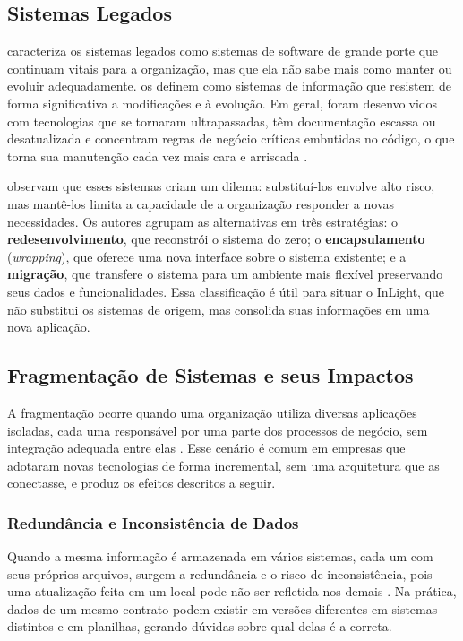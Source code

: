 \subsection{Sistemas Legados}

\citet{bennett1995} caracteriza os sistemas legados como sistemas de software de grande porte que continuam vitais para a organização, mas que ela não sabe mais como manter ou evoluir adequadamente. \citet{bisbal1999} os definem como sistemas de informação que resistem de forma significativa a modificações e à evolução. Em geral, foram desenvolvidos com tecnologias que se tornaram ultrapassadas, têm documentação escassa ou desatualizada e concentram regras de negócio críticas embutidas no código, o que torna sua manutenção cada vez mais cara e arriscada \citep{bisbal1999,pressman2016}.

\citet{bisbal1999} observam que esses sistemas criam um dilema: substituí-los envolve alto risco, mas mantê-los limita a capacidade de a organização responder a novas necessidades. Os autores agrupam as alternativas em três estratégias: o \textbf{redesenvolvimento}, que reconstrói o sistema do zero; o \textbf{encapsulamento} (\textit{wrapping}), que oferece uma nova interface sobre o sistema existente; e a \textbf{migração}, que transfere o sistema para um ambiente mais flexível preservando seus dados e funcionalidades. Essa classificação é útil para situar o InLight, que não substitui os sistemas de origem, mas consolida suas informações em uma nova aplicação.

\subsection{Fragmentação de Sistemas e seus Impactos}

A fragmentação ocorre quando uma organização utiliza diversas aplicações isoladas, cada uma responsável por uma parte dos processos de negócio, sem integração adequada entre elas \citep{laudon2020}. Esse cenário é comum em empresas que adotaram novas tecnologias de forma incremental, sem uma arquitetura que as conectasse, e produz os efeitos descritos a seguir.

\subsubsection{Redundância e Inconsistência de Dados}

Quando a mesma informação é armazenada em vários sistemas, cada um com seus próprios arquivos, surgem a redundância e o risco de inconsistência, pois uma atualização feita em um local pode não ser refletida nos demais \citep{elmasri2016}. Na prática, dados de um mesmo contrato podem existir em versões diferentes em sistemas distintos e em planilhas, gerando dúvidas sobre qual delas é a correta.


